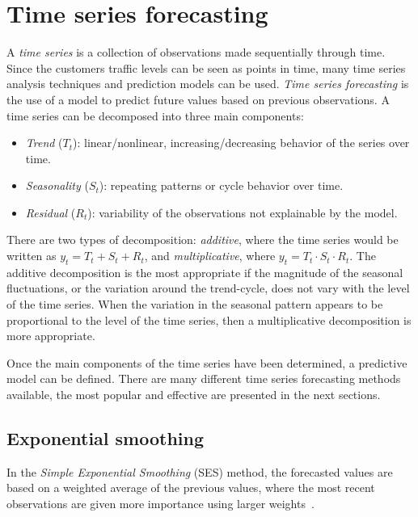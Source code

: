 \section{Time series forecasting}
\label{sec:time_series_forecasting}

A \emph{time series} is a collection of observations made sequentially through time. Since the customers traffic levels can be seen as points in time, many time series analysis techniques and prediction models can be used. \emph{Time series forecasting} is the use of a model to predict future values based on previous observations. A time series can be decomposed into three main components:
\begin{itemize}
  \item \emph{Trend} (\( T_t \)): linear/nonlinear, increasing/decreasing behavior of the series over time.
  \item \emph{Seasonality} (\( S_t \)): repeating patterns or cycle behavior over time.
  \item \emph{Residual} (\( R_t \)): variability of the observations not explainable by the model.
\end{itemize}

There are two types of decomposition: \emph{additive}, where the time series would be written as \( y_t = T_t + S_t + R_t \), and \emph{multiplicative}, where \( y_t = T_t \cdot S_t \cdot R_t \). The additive decomposition is the most appropriate if the magnitude of the seasonal fluctuations, or the variation around the trend-cycle, does not vary with the level of the time series. When the variation in the seasonal pattern appears to be proportional to the level of the time series, then a multiplicative decomposition is more appropriate.

Once the main components of the time series have been determined, a predictive model can be defined. There are many different time series forecasting methods available, the most popular and effective are presented in the next sections.

\subsection{Exponential smoothing}
\label{subsec:exponential_smoothing}

In the \emph{Simple Exponential Smoothing} (SES) method, the forecasted values are based on a weighted average of the previous values, where the most recent observations are given more importance using larger weights~\cite{brown}.

